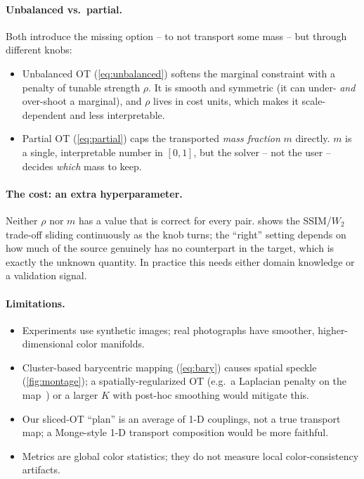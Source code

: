 \documentclass[11pt,a4paper]{article}
\begin{document}
\paragraph{Unbalanced vs.\ partial.} Both introduce the missing option -- to not
transport some mass -- but through different knobs:
\begin{itemize}
  \item Unbalanced OT (\cref{eq:unbalanced}) softens the marginal constraint with
        a penalty of tunable strength $\rho$. It is smooth and symmetric
        (it can under- \emph{and} over-shoot a marginal), and $\rho$ lives in
        cost units, which makes it scale-dependent and less interpretable.
  \item Partial OT (\cref{eq:partial}) caps the transported \emph{mass fraction}
        $m$ directly. $m$ is a single, interpretable number in $[0,1]$, but the
        solver -- not the user -- decides \emph{which} mass to keep.
\end{itemize}

\paragraph{The cost: an extra hyperparameter.} Neither $\rho$ nor $m$ has a value
that is correct for every pair.  shows the SSIM/$W_2$
trade-off sliding continuously as the knob turns; the ``right'' setting depends
on how much of the source genuinely has no counterpart in the target, which is
exactly the unknown quantity. In practice this needs either domain knowledge or
a validation signal.

\paragraph{Limitations.}
\begin{itemize}
  \item Experiments use synthetic images; real photographs have smoother,
        higher-dimensional color manifolds.
  \item Cluster-based barycentric mapping (\cref{eq:bary}) causes spatial speckle
        (\cref{fig:montage}); a spatially-regularized OT
        (e.g.\ a Laplacian penalty on the map~\cite{ferradans2014}) or a larger
        $K$ with post-hoc smoothing would mitigate this.
  \item Our sliced-OT ``plan'' is an average of 1-D couplings, not a true
        transport map; a Monge-style 1-D transport composition would be more
        faithful.
  \item Metrics are global color statistics; they do not measure local
        color-consistency artifacts.
\end{itemize}
\end{document}
